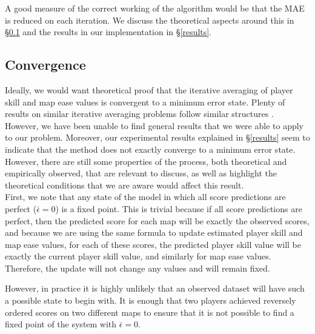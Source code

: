 \documentclass[12pt,a4paper]{article}
\begin{document}
A good measure of the correct working of the algorithm would be that the MAE is reduced on each iteration. We discuss the theoretical aspects around this in \S \ref{convergence} and the results in our implementation in \S \ref{results}.

\subsection{Convergence}
\label{convergence}

Ideally, we would want theoretical proof that the iterative averaging of player skill and map ease values is convergent to a minimum error state. Plenty of results on similar iterative averaging problems follow similar structures \cite{convergence_speed_distributed_consensus,averaging_improve_convergence,average_convergence_iterative_projection,iterative_averaging_saddle_point_problems}. However, we have been unable to find general results that we were  able to apply to our problem. Moreover, our experimental results explained in \S \ref{results} seem to indicate that the method does not exactly converge to a minimum error state. However, there are still some properties of the process, both theoretical and empirically observed, that are relevant to discuss, as well as highlight the theoretical conditions that we are aware would affect this result.\\

First, we note that any state of the model in which all score predictions are perfect ($\bar{\epsilon} = 0$) is a fixed point. This is trivial because if all score predictions are perfect, then the predicted score for each map will be exactly the observed scores, and because we are using the same formula to update estimated player skill and map ease values, for each of these scores, the predicted player skill value will be exactly the current player skill value, and similarly for map ease values. Therefore, the update will not change any values and will remain fixed.

However, in practice it is highly unlikely that an observed dataset will have such a possible state to begin with. It is enough that two players achieved reversely ordered scores on two different maps to ensure that it is not possible to find a fixed point of the system with $\bar{\epsilon} = 0$.\\
\end{document}

